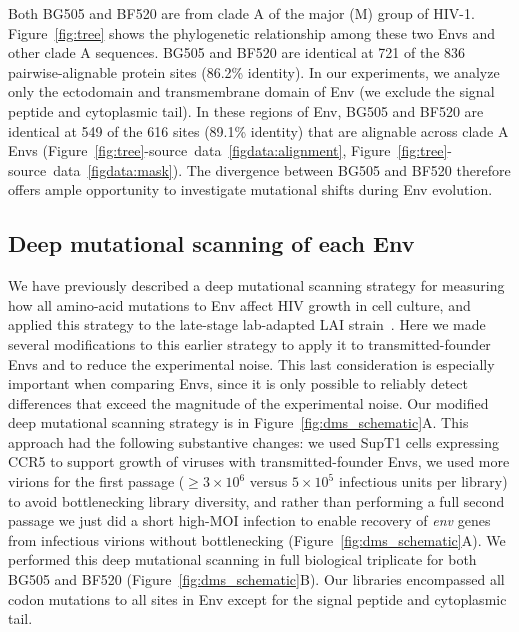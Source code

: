 \documentclass[9pt]{elife}
\begin{document}
Both BG505 and BF520 are from clade A of the major (M) group of HIV-1.
Figure~\ref{fig:tree} shows the phylogenetic relationship among these two Envs and other clade A sequences.
BG505 and BF520 are identical at 721 of the 836 pairwise-alignable protein sites (86.2\% identity).
In our experiments, we analyze only the ectodomain and transmembrane domain of Env (we exclude the signal peptide and cytoplasmic tail).
In these regions of Env, BG505 and BF520 are identical at 549 of the 616 sites (89.1\% identity) that are alignable across clade A Envs (Figure~\ref{fig:tree}-source~data~\ref{figdata:alignment}, Figure~\ref{fig:tree}-source~data~\ref{figdata:mask}).
The divergence between BG505 and BF520 therefore offers ample opportunity to investigate mutational shifts during Env evolution.

\subsection{Deep mutational scanning of each Env}
We have previously described a deep mutational scanning strategy for measuring how all amino-acid mutations to Env affect HIV growth in cell culture, and applied this strategy to the late-stage lab-adapted LAI strain~\citep{haddox2016experimental}.
Here we made several modifications to this earlier strategy to apply it to transmitted-founder Envs and to reduce the experimental noise. 
This last consideration is especially important when comparing Envs, since it is only possible to reliably detect differences that exceed the magnitude of the experimental noise. 
Our modified deep mutational scanning strategy is in Figure~\ref{fig:dms_schematic}A.
This approach had the following substantive changes: we used SupT1 cells expressing CCR5 to support growth of viruses with transmitted-founder Envs, we used more virions for the first passage ($\ge 3 \times 10^6$ versus $5\times 10^5$ infectious units per library) to avoid bottlenecking library diversity, and rather than performing a full second passage we just did a short high-MOI infection to enable recovery of \textit{env} genes from infectious virions without bottlenecking (Figure~\ref{fig:dms_schematic}A).
We performed this deep mutational scanning in full biological triplicate for both BG505 and BF520 (Figure~\ref{fig:dms_schematic}B).
Our libraries encompassed all codon mutations to all sites in Env except for the signal peptide and cytoplasmic tail.
\end{document}
